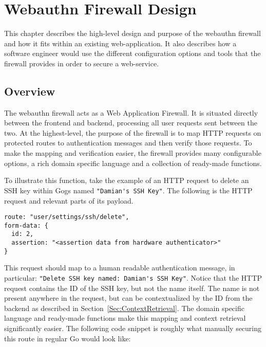 \chapter{Webauthn Firewall Design}\label{Chap:WebauthnFirewallDesign}

This chapter describes the high-level design and purpose of the webauthn firewall and how it fits within an existing web-application. It also describes how a software engineer would use the different configuration options and tools that the firewall provides in order to secure a web-service.

\section{Overview}

The webauthn firewall acts as a Web Application Firewall. It is situated directly between the frontend and backend, processing all user requests sent between the two. At the highest-level, the purpose of the firewall is to map HTTP requests on protected routes to authentication messages and then verify those requests. To make the mapping and verification easier, the firewall provides many configurable options, a rich domain specific language and a collection of ready-made functions.

To illustrate this function, take the example of an HTTP request to delete an SSH key within Gogs named \lstinline{"Damian's SSH Key"}. The following is the HTTP request and relevant parts of its payload.

\begin{lstlisting}
route: "user/settings/ssh/delete",
form-data: {
  id: 2,
  assertion: "<assertion data from hardware authenticator>"
}
\end{lstlisting}

This request should map to a human readable authentication message, in particular: \lstinline{"Delete SSH key named: Damian's SSH Key"}. Notice that the HTTP request contains the ID of the SSH key, but not the name itself. The name is not present anywhere in the request, but can be contextualized by the ID from the backend as described in Section~\ref{Sec:ContextRetrieval}. The domain specific language and ready-made functions make this mapping and context retrieval significantly easier. The following code snippet is roughly what manually securing this route in regular Go would look like:

